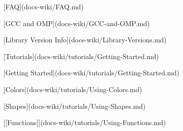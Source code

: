 
\begin{DoxyItemize}
\item \mbox{[}\-F\-A\-Q\mbox{]}(docs-\/wiki/\-F\-A\-Q.\-md)
\item \mbox{[}\-G\-C\-C and \-O\-M\-P\mbox{]}(docs-\/wiki/\-G\-C\-C-\/and-\/\-O\-M\-P.\-md)
\item \mbox{[}\-Library \-Version \-Info\mbox{]}(docs-\/wiki/\-Library-\/\-Versions.\-md)
\item \mbox{[}\-Tutorials\mbox{]}(docs-\/wiki/tutorials/\-Getting-\/\-Started.\-md)
\begin{DoxyItemize}
\item \mbox{[}\-Getting \-Started\mbox{]}(docs-\/wiki/tutorials/\-Getting-\/\-Started.\-md)
\item \mbox{[}\-Colors\mbox{]}(docs-\/wiki/tutorials/\-Using-\/\-Colors.\-md)
\item \mbox{[}\-Shapes\mbox{]}(docs-\/wiki/tutorials/\-Using-\/\-Shapes.\-md)
\item \mbox{[}\mbox{[}\-Functions\mbox{]}\mbox{]}(docs-\/wiki/tutorials/\-Using-\/\-Functions.\-md)
\end{DoxyItemize}
\end{DoxyItemize}